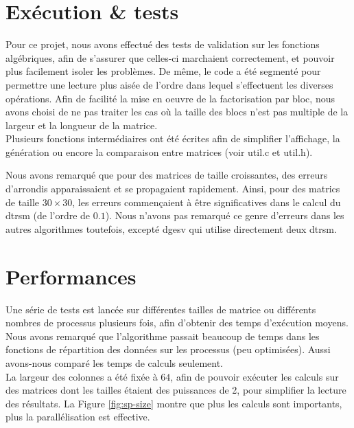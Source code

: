 \section{Exécution \& tests} %
\label{sec:execution}

Pour ce projet, nous avons effectué des tests de validation sur les fonctions algébriques, afin de s'assurer que celles-ci marchaient correctement, et pouvoir plus facilement isoler les problèmes. De même, le code a été segmenté pour permettre une lecture plus aisée de l'ordre dans lequel s'effectuent les diverses opérations. Afin de facilité la mise en oeuvre de la factorisation par bloc, nous avons choisi de ne pas traiter les cas où la taille des blocs n'est pas multiple de la largeur et la longueur de la matrice.\\

Plusieurs fonctions intermédiaires ont été écrites afin de simplifier l'affichage, la génération ou encore la comparaison entre matrices (voir util.c et util.h).

Nous avons remarqué que pour des matrices de taille croissantes, des erreurs d'arrondis apparaissaient et se propagaient rapidement. Ainsi, pour des matrics de taille $30 \times 30$, les erreurs commençaient à être significatives dans le calcul du dtrsm (de l'ordre de $0.1$). Nous n'avons pas remarqué ce genre d'erreurs dans les autres algorithmes toutefois, excepté dgesv qui utilise directement deux dtrsm. 

\section{Performances} %
\label{sec:perf}

Une série de tests est lancée sur différentes tailles de matrice ou différents nombres de processus plusieurs fois, afin d'obtenir des temps d'exécution moyens. Nous avons remarqué que l'algorithme passait beaucoup de temps dans les fonctions de répartition des données sur les processus (peu optimisées). Aussi avons-nous comparé les temps de calculs seulement. \\

La largeur des colonnes a été fixée à $64$, afin de pouvoir exécuter les calculs sur des matrices dont les tailles étaient des puissances de 2, pour simplifier la lecture des résultats. 
La Figure \ref{fig:sp-size} montre que plus les calculs sont importants, plus la parallélisation est effective.

